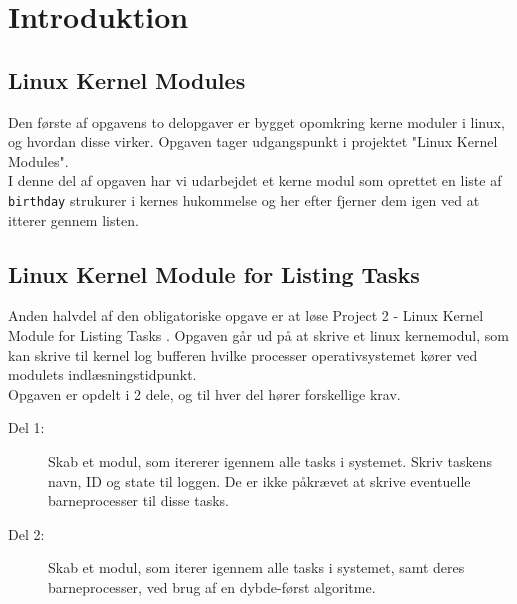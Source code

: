 \documentclass[main.tex]{subfile}
\begin{document}
\section{Introduktion}
\subsection{Linux Kernel Modules}
Den første af opgavens to delopgaver er bygget opomkring kerne moduler i linux, og hvordan disse virker. Opgaven tager udgangspunkt i projektet "Linux Kernel Modules"\cite[s.94]{SA:2013}.\\

I denne del af opgaven har vi udarbejdet et kerne modul som oprettet en liste af \texttt{birthday} strukurer i kernes hukommelse og her efter fjerner dem igen ved at itterer gennem listen.

\subsection{Linux Kernel Module for Listing Tasks}
Anden halvdel af den obligatoriske opgave er at løse Project 2 - Linux Kernel Module for Listing Tasks \cite[s.156-158]{SA:2013}. Opgaven går ud på at skrive et linux kernemodul, som kan skrive til kernel log bufferen hvilke processer operativsystemet kører ved modulets indlæsningstidpunkt.\\

Opgaven er opdelt i 2 dele, og til hver del hører forskellige krav.

\begin{description}
\item[Del 1:] Skab et modul, som itererer igennem alle tasks i systemet. Skriv taskens navn, ID og state til loggen. De er ikke påkrævet at skrive eventuelle barneprocesser til disse tasks.
\item[Del 2:] Skab et modul, som iterer igennem alle tasks i systemet, samt deres barneprocesser, ved brug af en dybde-først algoritme.
\end{description}
\end{document}
